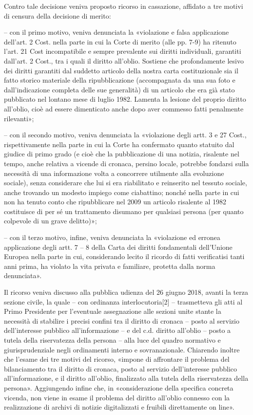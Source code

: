Contro tale decisione veniva proposto ricorso in cassazione, affidato a tre motivi di censura della decisione di merito:

– con il primo motivo, veniva denunciata la «violazione e falsa applicazione dell’art. 2 Cost. nella parte in cui la Corte di merito (alle pp. 7-9) ha ritenuto l’art. 21 Cost incompatibile e sempre prevalente sui diritti individuali, garantiti dall’art. 2 Cost., tra i quali il diritto all’oblio. Sostiene che profondamente lesivo dei diritti garantiti dal suddetto articolo della nostra carta costituzionale sia il fatto storico materiale della ripubblicazione (accompagnata da una sua foto e dall’indicazione completa delle sue generalità) di un articolo che era già stato pubblicato nel lontano mese di luglio 1982. Lamenta la lesione del proprio diritto all’oblio, cioè ad essere dimenticato anche dopo aver commesso fatti penalmente rilevanti»;

– con il secondo motivo, veniva denunciata la «violazione degli artt. 3 e 27 Cost., rispettivamente nella parte in cui la Corte ha confermato quanto statuito dal giudice di primo grado (e cioè che la pubblicazione di una notizia, risalente nel tempo, anche relativa a vicende di cronaca, persino locale, potrebbe fondarsi sulla necessità di una informazione volta a concorrere utilmente alla evoluzione sociale), senza considerare che lui si era riabilitato e reinserito nel tessuto sociale, anche trovando un modesto impiego come ciabattino; nonché nella parte in cui non ha tenuto conto che ripubblicare nel 2009 un articolo risalente al 1982 costituisce di per sé un trattamento disumano per qualsiasi persona (per quanto colpevole di un grave delitto)»;

– con il terzo motivo, infine, veniva denunciata la «violazione ed erronea applicazione degli artt. 7 – 8 della Carta dei diritti fondamentali dell’Unione Europea nella parte in cui, considerando lecito il ricordo di fatti verificatisi tanti anni prima, ha violato la vita privata e familiare, protetta dalla norma denunciata».

Il ricorso veniva discusso alla pubblica udienza del 26 giugno 2018, avanti la terza sezione civile, la quale – con ordinanza interlocutoria[2] – trasmetteva gli atti al Primo Presidente per l’eventuale assegnazione alle sezioni unite stante la necessità di stabilire i precisi confini tra il diritto di cronaca – posto al servizio dell’interesse pubblico all’informazione – e del c.d. diritto all’oblio – posto a tutela della riservatezza della persona – alla luce del quadro normativo e giurisprudenziale negli ordinamenti interno e sovranazionale. Chiarendo inoltre che l’esame dei tre motivi del ricorso, «impone di affrontare il problema del bilanciamento tra il diritto di cronaca, posto al servizio dell’interesse pubblico all’informazione, e il diritto all’oblio, finalizzato alla tutela della riservatezza della persona». Aggiungendo infine che, in «considerazione della specifica concreta vicenda, non viene in esame il problema del diritto all’oblio connesso con la realizzazione di archivi di notizie digitalizzati e fruibili direttamente on line».

